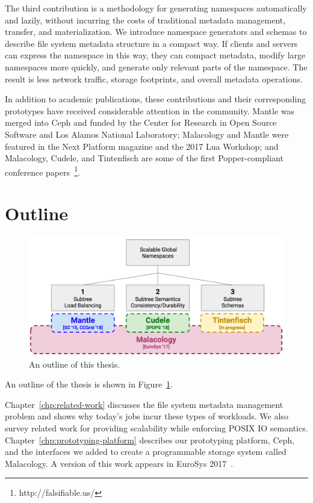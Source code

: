 The third contribution is a methodology for generating namespaces automatically
and lazily, without incurring the costs of traditional metadata management,
transfer, and materialization.  We introduce namespace generators and schemas
to describe file system metadata structure in a compact way. If clients and
servers can express the namespace in this way, they can compact metadata,
modify large namespaces more quickly, and generate only relevant parts of the
namespace. The result is less network traffic, storage footprints, and overall
metadata operations.  

In addition to academic publications, these contributions and their
corresponding prototypes have received considerable attention in the community.
Mantle was merged into Ceph and funded by the Center for Research in Open
Source Software and Los Alamos National Laboratory; Malacology and Mantle were
featured in the Next Platform magazine and the 2017 Lua Workshop; and
Malacology, Cudele, and Tintenfisch are some of the first
Popper-compliant~\cite{jimenez:login16-popper, jimenez:ipdpsw17-popper,
jimenez_tackling_2015, jimenez_aver_2016, jimenez:rr18-popper} conference
papers~\footnote{http://falsifiable.us/}.

\section{Outline}

\begin{figure}[tb]
  \centering
  \includegraphics[width=1\textwidth]{./chapters/overview.png}
  \caption{An outline of this thesis.}
  \label{fig:thesis-overview}
\end{figure}

An outline of the thesis is shown in Figure~\ref{fig:thesis-overview}.

Chapter~\ref{chp:related-work} discusses the file system metadata management
problem and shows why today's jobs incur these types of workloads. We also
survey related work for providing scalability while enforcing POSIX IO
semantics. Chapter~\ref{chp:prototyping-platform} describes our prototyping
platform, Ceph, and the interfaces we added to create a programmable storage
system called Malacology. A version of this work appears in EuroSys
2017~\cite{sevilla:eurosys17-malacology}.

